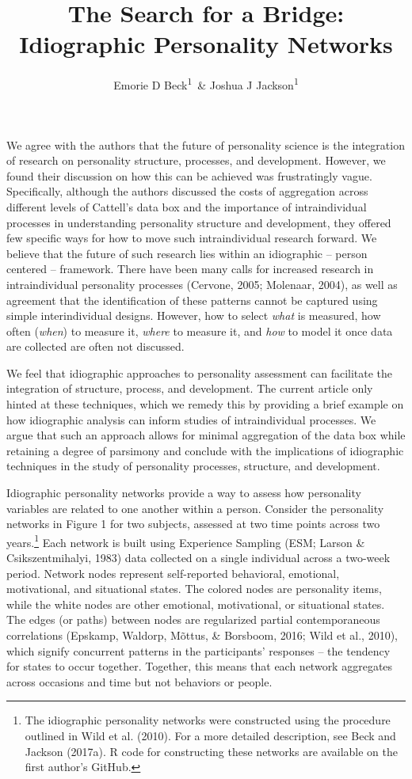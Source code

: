 \documentclass[english,floatsintext,man]{apa6}
\title{The Search for a Bridge: Idiographic Personality Networks}
\author{Emorie D Beck\textsuperscript{1}~\& Joshua J Jackson\textsuperscript{1}}
\affiliation{
    \vspace{0.5cm}
          \textsuperscript{1} Washington University in St.~Louis  }
\newcounter{author}
\theoremstyle{definition}
\theoremstyle{definition}
\theoremstyle{remark}
\begin{document}
\maketitle

\setcounter{secnumdepth}{0}



We agree with the authors that the future of personality science is the
integration of research on personality structure, processes, and
development. However, we found their discussion on how this can be
achieved was frustratingly vague. Specifically, although the authors
discussed the costs of aggregation across different levels of Cattell's
data box and the importance of intraindividual processes in
understanding personality structure and development, they offered few
specific ways for how to move such intraindividual research forward. We
believe that the future of such research lies within an idiographic --
person centered -- framework. There have been many calls for increased
research in intraindividual personality processes (Cervone, 2005;
Molenaar, 2004), as well as agreement that the identification of these
patterns cannot be captured using simple interindividual designs.
However, how to select \emph{what} is measured, how often (\emph{when})
to measure it, \emph{where} to measure it, and \emph{how} to model it
once data are collected are often not discussed.

We feel that idiographic approaches to personality assessment can
facilitate the integration of structure, process, and development. The
current article only hinted at these techniques, which we remedy this by
providing a brief example on how idiographic analysis can inform studies
of intraindividual processes. We argue that such an approach allows for
minimal aggregation of the data box while retaining a degree of
parsimony and conclude with the implications of idiographic techniques
in the study of personality processes, structure, and development.

Idiographic personality networks provide a way to assess how personality
variables are related to one another within a person. Consider the
personality networks in Figure 1 for two subjects, assessed at two time
points across two years.\footnote{The idiographic personality networks
  were constructed using the procedure outlined in Wild et al. (2010).
  For a more detailed description, see Beck and Jackson (2017a). R code
  for constructing these networks are available on the first author's
  GitHub.} Each network is built using Experience Sampling (ESM; Larson
\& Csikszentmihalyi, 1983) data collected on a single individual across
a two-week period. Network nodes represent self-reported behavioral,
emotional, motivational, and situational states. The colored nodes are
personality items, while the white nodes are other emotional,
motivational, or situational states. The edges (or paths) between nodes
are regularized partial contemporaneous correlations (Epskamp, Waldorp,
Mõttus, \& Borsboom, 2016; Wild et al., 2010), which signify concurrent
patterns in the participants' responses -- the tendency for states to
occur together. Together, this means that each network aggregates across
occasions and time but not behaviors or people.
\end{document}
